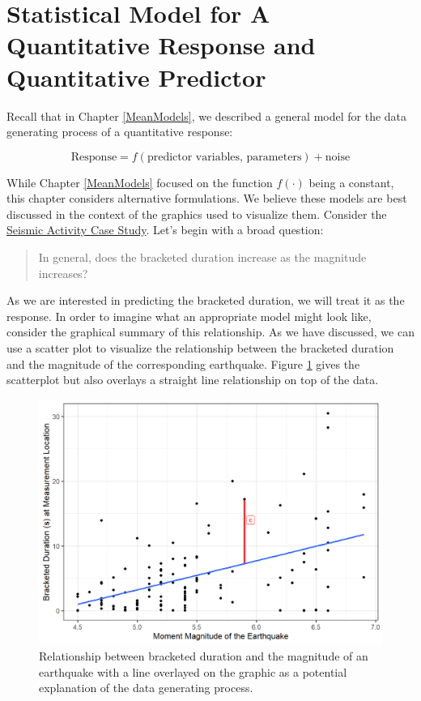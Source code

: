 \documentclass[
]{book}
\theoremstyle{plain}
\theoremstyle{mydefn}
\theoremstyle{myexmpl}
\theoremstyle{remark}
\begin{document}
\hypertarget{statistical-model-for-a-quantitative-response-and-quantitative-predictor}{%
\section{Statistical Model for A Quantitative Response and Quantitative Predictor}\label{statistical-model-for-a-quantitative-response-and-quantitative-predictor}}

Recall that in Chapter \ref{MeanModels}, we described a general model for the data generating process of a quantitative response:

\[\text{Response} = f(\text{predictor variables, parameters}) + \text{noise}\]

While Chapter \ref{MeanModels} focused on the function \(f(\cdot)\) being a constant, this chapter considers alternative formulations. We believe these models are best discussed in the context of the graphics used to visualize them. Consider the \protect\hyperlink{CaseGreece}{Seismic Activity Case Study}. Let's begin with a broad question:

\begin{quote}
In general, does the bracketed duration increase as the magnitude increases?
\end{quote}

As we are interested in predicting the bracketed duration, we will treat it as the response. In order to imagine what an appropriate model might look like, consider the graphical summary of this relationship. As we have discussed, we can use a scatter plot to visualize the relationship between the bracketed duration and the magnitude of the corresponding earthquake. Figure \ref{fig:regmodel-slr-plot} gives the scatterplot but also overlays a straight line relationship on top of the data.

\begin{figure}

{\centering \includegraphics[width=0.8\linewidth]{./Images/regmodel-slr-plot-1} 

}

\caption{Relationship between bracketed duration and the magnitude of an earthquake with a line overlayed on the graphic as a potential explanation of the data generating process.}\label{fig:regmodel-slr-plot}
\end{figure}
\end{document}
